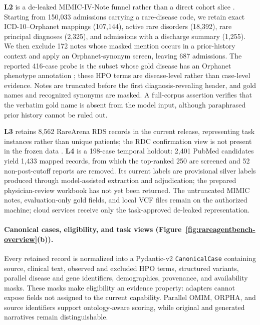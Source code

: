 \documentclass[letterpaper]{article} %
\begin{document}
\textbf{L2} is a de-leaked MIMIC-IV-Note funnel rather than a direct cohort
slice \citep{johnson2024mimiciv31}. Starting from 150,033 admissions carrying
a rare-disease code, we retain exact ICD-10--Orphanet mappings (107,144),
active rare disorders (18,392), rare principal diagnoses (2,325), and
admissions with a discharge summary (1,255). We then exclude 172 notes whose
masked mention occurs in a prior-history context and apply an
Orphanet-synonym screen, leaving 687 admissions. The reported 416-case probe
is the subset whose gold disease has an Orphanet phenotype annotation
\citep{orphadata2026nomenclature}; these HPO terms are disease-level rather
than case-level evidence. Notes are truncated before the first
diagnosis-revealing header, and gold names and recognized synonyms are
masked. A full-corpus assertion verifies that the verbatim gold name is absent
from the model input, although paraphrased prior history cannot be ruled out.

\textbf{L3} retains 8,562 RareArena RDS records in the current release,
representing task instances rather than unique patients; the RDC confirmation
view is not present in the frozen data \citep{chen2026rarearena}.
\textbf{L4} is a 198-case temporal holdout: 2,401 PubMed candidates yield
1,433 mapped records, from which the top-ranked 250 are screened and 52
non-post-cutoff reports are removed. Its current labels are provisional
silver labels produced through model-assisted extraction and adjudication;
the prepared physician-review workbook has not yet been returned. The
untruncated MIMIC notes, evaluation-only gold fields, and local VCF files
remain on the authorized machine; cloud services receive only the
task-approved de-leaked representation.

\paragraph{Canonical cases, eligibility, and task views
(Figure~\ref{fig:rareagentbench-overview}(b)).}
Every retained record is normalized into a Pydantic-v2
\texttt{CanonicalCase} containing source, clinical text, observed and
excluded HPO terms, structured variants, parallel disease and gene
identifiers, demographics, provenance, and availability masks. These masks
make eligibility an evidence property: adapters cannot expose fields not
assigned to the current capability. Parallel OMIM, ORPHA, and source
identifiers support ontology-aware scoring, while original and generated
narratives remain distinguishable.
\end{document}
